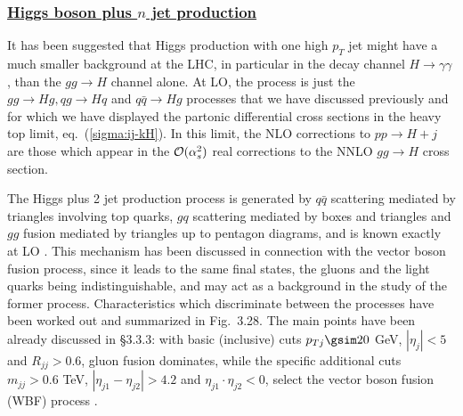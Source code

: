 \subsubsection*{\underline{Higgs boson plus $n$ jet production}}

It has been suggested that Higgs production with one high $p_T$ jet might have
a much smaller background at the LHC, in particular in the decay channel $H \to
\gamma \gamma$ \cite{ggHp-dubinin}, than the $gg \to H$ channel alone. At LO, 
the process is just the $gg \to Hg, qg \to Hq$ and  $q \bar q \to Hg$ processes
that we have discussed previously and for which we have displayed the partonic
differential cross sections in the heavy top limit, eq.~(\ref{sigma:ij-kH}). In
this limit, the NLO corrections to $pp \to H+j$ are those which appear in the
${\cal O}(\alpha_s^2)$ real corrections to the NNLO $gg \to H$ cross section. \s

The Higgs plus 2 jet production process is  generated by $q\bar q$ scattering 
mediated by triangles involving top quarks, $gq$ scattering mediated by boxes 
and triangles and $gg$ fusion mediated by triangles up to pentagon diagrams, 
and is known exactly at LO \cite{pp-ggHqq}. This mechanism has been discussed 
in connection with the vector boson fusion process, since it leads to the same 
final states, the gluons and the light quarks being indistinguishable, and may 
act as a background in the study of the former process. Characteristics which 
discriminate between the processes have been worked out and summarized in 
Fig.~3.28. The main points have been already discussed in \S3.3.3: with
basic (inclusive) cuts $p_{Tj} \gsim 20$ GeV, $|\eta_j| <5$ and $R_{jj} >0.6$, 
gluon fusion dominates, while the specific additional cuts $m_{jj} >0.6$ TeV, 
$|\eta_{j1}- \eta_{j2}| >4.2$ and $\eta_{j1} \cdot \eta_{j2} <0$, select the 
vector boson fusion (WBF) process \cite{Vittorio}.  

